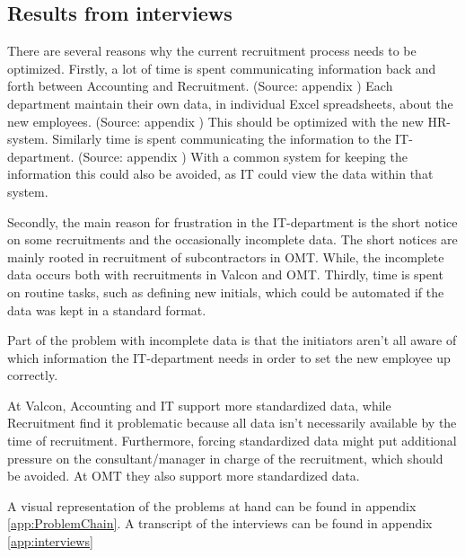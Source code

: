 \subsection{Results from interviews}
There are several reasons why the current recruitment process needs to be optimized.
Firstly, a lot of time is spent communicating information back and forth between Accounting and Recruitment. (Source: appendix )
Each department maintain their own data, in individual Excel spreadsheets, about the new employees. (Source: appendix )
This should be optimized with the new HR-system.
Similarly time is spent communicating the information to the IT-department. (Source: appendix )
With a common system for keeping the information this could also be avoided, as IT could view the data within that system.

Secondly, the main reason for frustration in the IT-department is the short notice on some recruitments and the occasionally incomplete data.
The short notices are mainly rooted in recruitment of subcontractors in OMT.
While, the incomplete data occurs both with recruitments in Valcon and OMT.
Thirdly, time is spent on routine tasks, such as defining new initials, which could be automated if the data was kept in a standard format.

Part of the problem with incomplete data is that the initiators aren't all aware of which information the IT-department needs in order to set the new employee up correctly.

At Valcon, Accounting and IT support more standardized data, while Recruitment find it problematic because all data isn't necessarily available by the time of recruitment.
Furthermore, forcing standardized data might put additional pressure on the consultant/manager in charge of the recruitment, which should be avoided.
At OMT they also support more standardized data.

A visual representation of the problems at hand can be found in appendix \ref{app:ProblemChain}.
A transcript of the interviews can be found in appendix \ref{app:interviews}
